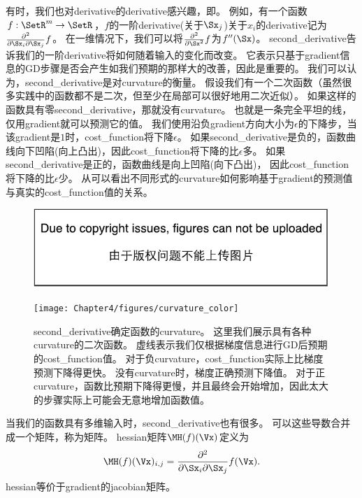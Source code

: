 有时，我们也对\gls{derivative}的\gls{derivative}感兴趣，即。
例如，有一个函数$f: \SetR^m \rightarrow \SetR$，$f$的一阶\gls{derivative}(关于$\Sx_j$)关于$x_i$的\gls{derivative}记为$\frac{\partial^2}{\partial \Sx_i \partial \Sx_j} f$。
在一维情况下，我们可以将$\frac{\partial^2}{\partial \Sx^2} f$为$f''(\Sx)$。
\gls{second_derivative}告诉我们的一阶\gls{derivative}将如何随着输入的变化而改变。
它表示只基于\gls{gradient}信息的\gls{GD}步骤是否会产生如我们预期的那样大的改善，因此是重要的。
我们可以认为，\gls{second_derivative}是对\gls{curvature}的衡量。
假设我们有一个二次函数（虽然很多实践中的函数都不是二次，但至少在局部可以很好地用二次近似）。
如果这样的函数具有零\gls{second_derivative}，那就没有\gls{curvature}。
也就是一条完全平坦的线，仅用\gls{gradient}就可以预测它的值。
我们使用沿负\gls{gradient}方向大小为$\epsilon$的下降步，当该\gls{gradient}是$1$时，\gls{cost_function}将下降$\epsilon$。
如果\gls{second_derivative}是负的，函数曲线向下凹陷(向上凸出)，因此\gls{cost_function}将下降的比$\epsilon$多。
如果\gls{second_derivative}是正的，函数曲线是向上凹陷(向下凸出)，
因此\gls{cost_function}将下降的比$\epsilon$少。
从可以看出不同形式的\gls{curvature}如何影响基于\gls{gradient}的预测值与真实的\gls{cost_function}值的关系。
\begin{figure}[!htb]
\ifOpenSource
\centerline{\includegraphics{figure.pdf}}
\else
\centerline{\texttt{[image: Chapter4/figures/curvature\_color]}}
\fi
\caption{\gls{second_derivative}确定函数的\gls{curvature}。
这里我们展示具有各种\gls{curvature}的二次函数。
虚线表示我们仅根据梯度信息进行\gls{GD}后预期的\gls{cost_function}值。
对于负\gls{curvature}，\gls{cost_function}实际上比梯度预测下降得更快。
没有\gls{curvature}时，梯度正确预测下降值。
对于正\gls{curvature}，函数比预期下降得更慢，并且最终会开始增加，因此太大的步骤实际上可能会无意地增加函数值。
}
\label{fig:chap4_curvature_color}
\end{figure}

当我们的函数具有多维输入时，\gls{second_derivative}也有很多。
可以这些导数合并成一个矩阵，称为矩阵。
\gls{hessian}矩阵$\MH(f)(\Vx)$定义为
\begin{align}
 \MH(f)(\Vx)_{i,j} = \frac{\partial^2}{\partial \Sx_i \partial  \Sx_j} f(\Vx).
\end{align}
\gls{hessian}等价于\gls{gradient}的\gls{jacobian}矩阵。

